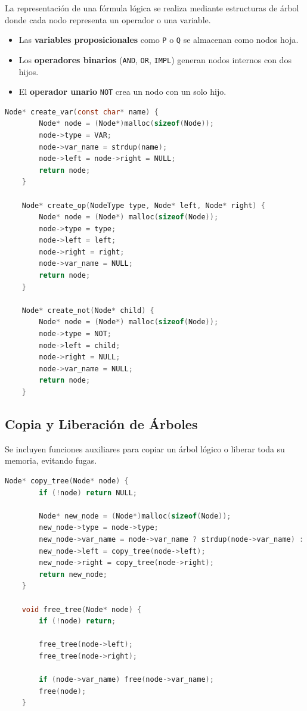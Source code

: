 \documentclass{report}
\begin{document}
	La representación de una fórmula lógica se realiza mediante estructuras de árbol donde cada nodo representa un operador o una variable.

	\begin{itemize}
		\item Las \textbf{variables proposicionales} como \texttt{P} o \texttt{Q} se almacenan como nodos hoja.
		\item Los \textbf{operadores binarios} (\texttt{AND}, \texttt{OR}, \texttt{IMPL}) generan nodos internos con dos hijos.
		\item El \textbf{operador unario} \texttt{NOT} crea un nodo con un solo hijo.
	\end{itemize}

	\begin{lstlisting}[language=C, caption={Creación de nodos para el árbol sintáctico}]
	Node* create_var(const char* name) {
		Node* node = (Node*)malloc(sizeof(Node));
		node->type = VAR;
		node->var_name = strdup(name);
		node->left = node->right = NULL;
		return node;
	}

	Node* create_op(NodeType type, Node* left, Node* right) {
		Node* node = (Node*) malloc(sizeof(Node));
		node->type = type;
		node->left = left;
		node->right = right;
		node->var_name = NULL;
		return node;
	}

	Node* create_not(Node* child) {
		Node* node = (Node*) malloc(sizeof(Node));
		node->type = NOT;
		node->left = child;
		node->right = NULL;
		node->var_name = NULL;
		return node;
	}
	\end{lstlisting}

	\subsection{Copia y Liberación de Árboles}

	Se incluyen funciones auxiliares para copiar un árbol lógico o liberar toda su memoria, evitando fugas.

	\begin{lstlisting}[language=C, caption={Copia y liberación de árboles lógicos}]
	Node* copy_tree(Node* node) {
		if (!node) return NULL;

		Node* new_node = (Node*)malloc(sizeof(Node));
		new_node->type = node->type;
		new_node->var_name = node->var_name ? strdup(node->var_name) : NULL;
		new_node->left = copy_tree(node->left);
		new_node->right = copy_tree(node->right);
		return new_node;
	}

	void free_tree(Node* node) {
		if (!node) return;

		free_tree(node->left);
		free_tree(node->right);

		if (node->var_name) free(node->var_name);
		free(node);
	}
	\end{lstlisting}
\end{document}
